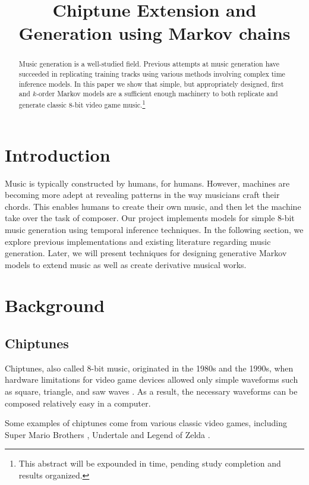 \documentclass{article}
\title{Chiptune Extension and Generation using Markov chains}
\begin{document}
\maketitle


\begin{abstract}
Music generation is a well-studied field. Previous attempts at music generation have succeeded in replicating training tracks using various methods involving complex 
time inference models. In this paper we show that simple, but appropriately designed, first and $k$-order Markov models are a sufficient enough machinery to both 
replicate and generate classic 8-bit video game music.\footnote{This abstract will be expounded in time, pending study completion and results organized.}
\end{abstract}

\section{Introduction}
Music is typically constructed by humans, for humans. However, machines are becoming more adept at revealing patterns in the way musicians craft their chords. 
This enables humans to create their own music, and then let the machine take over the task of composer. Our project implements models for simple 8-bit music 
generation using temporal inference techniques. In the following section, we explore previous implementations and existing literature regarding music generation. 
Later, we will present techniques for designing generative Markov models to extend music as well as create derivative musical works.

\section{Background}
\subsection{Chiptunes}
Chiptunes, also called 8-bit music, originated in the 1980s and the 1990s, when hardware limitations for video game devices allowed only simple waveforms such as 
square, triangle, and saw waves \cite{pop_chiptunes}.  As a result, the necessary waveforms can be composed relatively easy in a computer. 

Some examples of chiptunes come from various classic video games, including Super Mario Brothers \cite{kondo_2009}, Undertale \cite{fox_2017} and 
Legend of Zelda \cite{nakatsuka_2009}.
\end{document}
